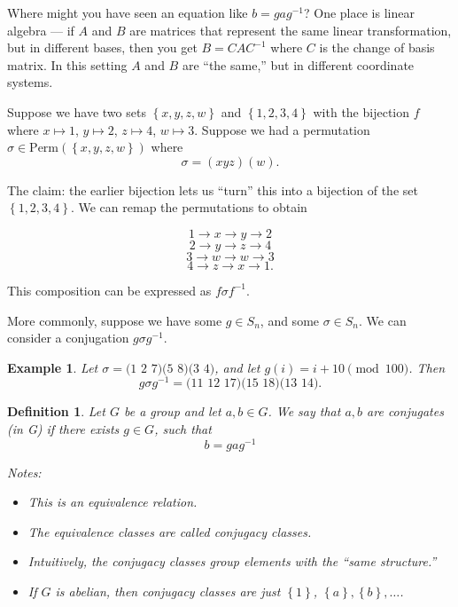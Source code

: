 \documentclass[12pt]{article}
\newtheorem*{definition}{Definition}
\newtheorem*{example}{Example}
\begin{document}
Where might you have seen an equation like $b = g a g^{-1}$?  One place is linear algebra --- if $A$ and $B$ are matrices that represent the same linear transformation, but in different bases, then you get $B = C A C^{-1}$ where $C$ is the change of basis matrix.  In this setting $A$ and $B$ are ``the same,'' but in different coordinate systems.

Suppose we have two sets $\left\{ x, y, z, w \right\}$ and $\left\{ 1, 2, 3, 4 \right\}$ with the bijection $f$ where $x \mapsto 1$, $y \mapsto 2$, $z \mapsto 4$, $w \mapsto 3$.  Suppose we had a permutation $\sigma \in \text{Perm}(\left\{ x, y, z, w \right\} )$
where 
\[
  \sigma = (x y z)(w).
\]

The claim: the earlier bijection lets us ``turn'' this into a bijection of the set $\left\{ 1, 2, 3, 4 \right\}$.  We can remap the permutations to obtain

\[
  1 \to x \to y \to 2
\]
\[
  2 \to y \to z \to 4
\]
\[
  3 \to w \to w \to 3
\]
\[
  4 \to z \to x \to 1.
\]

This composition can be expressed as $f \sigma f^{-1}$.

More commonly, suppose we have some $g \in S_n$, and some $\sigma \in S_n$.  We can consider a conjugation $g \sigma g^{-1}$.  

\begin{example}
  Let $\sigma = \text{(1 2 7)(5 8)(3 4)}$, and let $g(i) = i+10 \pmod{100}$.  Then
  \[
    g \sigma g^{-1} = \text{(11 12 17)(15 18)(13 14)}.
  \]
\end{example}


\begin{definition}
  Let $G$ be a group and let $a, b \in G$.  We say that $a, b$ are conjugates (in G) if there exists $g \in G$, such that
  \[
    b = g a g^{-1}
  \]

  Notes:
  \begin{itemize}
    \item This is an equivalence relation.
    \item The equivalence classes are called conjugacy classes.
    \item Intuitively, the conjugacy classes group elements with the ``same structure.''
    \item If $G$ is abelian, then conjugacy classes are just $\left\{ 1 \right\}$, $\left\{ a \right\}, \left\{ b \right\}, \dots$.
  \end{itemize}
\end{definition}
\end{document}
